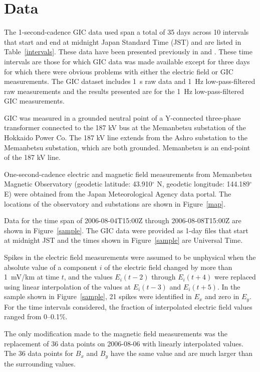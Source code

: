 \documentclass[draft,linenumbers]{agujournal2018}
\begin{document}
\section{Data}

The 1-second-cadence GIC data used span a total of 35 days across 10 intervals that start and end at midnight Japan Standard Time (JST) and are listed in Table~\ref{intervals}. These data have been presented previously in \citet{Watari2009} and \cite{Watari2015}. These time intervals are those for which GIC data was made available except for three days for which there were obvious problems with either the electric field or GIC measurements. The GIC dataset includes 1~s raw data and 1~Hz low-pass-filtered raw measurements and the results presented are for the 1~Hz low-pass-filtered GIC measurements.

GIC was measured in a grounded neutral point of a Y-connected three-phase transformer connected to the 187 kV bus at the Memanbetsu substation of the Hokkaido Power Co. The 187 kV line extends from the Ashro substation to the Memanbetsu substation, which are both grounded. Memanbetsu is an end-point of the 187 kV line.

One-second-cadence electric and magnetic field measurements from Memanbetsu Magnetic Observatory (geodetic latitude: 43.910$^{\circ}$ N, geodetic longitude: 144.189$^{\circ}$ E) were obtained from the Japan Meteorological Agency data portal. The locations of the observatory and substations are shown in Figure~\ref{map}.

Data for the time span of 2006-08-04T15:00Z through 2006-08-08T15:00Z are shown in Figure~\ref{sample}. The GIC data were provided as 1-day files that start at midnight JST and the times shown in Figure~\ref{sample} are Universal Time.

Spikes in the electric field measurements were assumed to be unphysical when the absolute value of a component $i$ of the electric field changed by more than 1~mV/km at time $t$, and the values $E_i(t-2)$ through $E_i(t+4)$ were replaced using linear interpolation of the values at $E_i(t-3)$ and $E_i(t + 5)$. In the sample shown in Figure~\ref{sample}, 21 spikes were identified in $E_x$ and zero in $E_y$. For the time intervals considered, the fraction of interpolated electric field values ranged from 0--0.1\%.

The only modification made to the magnetic field measurements was the replacement of 36 data points on 2006-08-06 with linearly interpolated values. The 36 data points for $B_x$ and $B_y$ have the same value and are much larger than the surrounding values.
\end{document}
